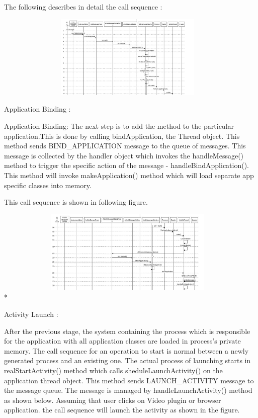 \documentclass[preprint,12pt]{elsarticle}
\begin{document}
The following describes in detail the call sequence  :

\includegraphics[width=13cm, height=4cm]{App_launch_1.jpg}

Application Binding :

Application Binding: The next step is to add the method to the particular application.This is done by calling bindApplication, the Thread object. This method sends BIND\_APPLICATION message to the queue of messages. This message is collected by the handler object which invokes the handleMessage() method to trigger the specific action of the message  - handleBindApplication(). This method will invoke makeApplication() method which will load separate app specific classes into memory.

This call sequence is shown in following figure.

\includegraphics[width=13cm, height=4cm]{App_launch_2.jpg}\\*
 
Activity Launch :

After the previous stage, the system containing the process which is responsible for the application with all application classes are loaded in process's private memory. The call sequence for an operation to start is normal between a newly generated process and an existing one. The actual process of launching starts in realStartActivity() method which calls sheduleLaunchActivity() on the application thread object. This method sends LAUNCH\_ACTIVITY message to the message queue. The message is managed by handleLaunchActivity() method as shown below.
Assuming that user clicks on Video plugin or browser application. the call sequence will launch the activity as shown in the figure.
\end{document}
